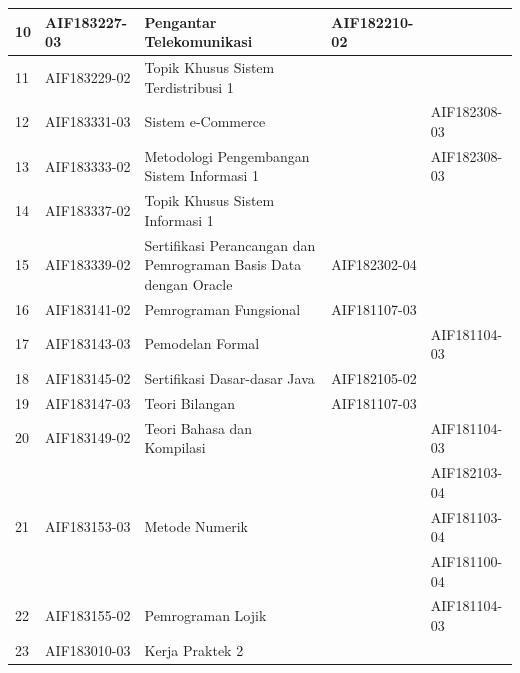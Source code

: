 \begin{table}[H]
\begin{tabular}{|p{0.5cm}|p{2.85cm}|p{4.95cm}|p{2.7cm}|p{2.7cm}|}
10 & AIF183227-03 & Pengantar Telekomunikasi                                         & AIF182210-02 &                    \\ \hline
11 & AIF183229-02 & Topik Khusus Sistem Terdistribusi 1                              &              &                    \\ \hline
12 & AIF183331-03 & Sistem e-Commerce                                                &              & AIF182308-03       \\ \hline
13 & AIF183333-02 & Metodologi Pengembangan Sistem Informasi 1                       &              & AIF182308-03       \\ \hline
14 & AIF183337-02 & Topik Khusus Sistem Informasi 1                                  &              &                    \\ \hline
15 & AIF183339-02 & Sertifikasi Perancangan dan Pemrograman Basis Data dengan Oracle & AIF182302-04 &                    \\ \hline
16 & AIF183141-02 & Pemrograman Fungsional                                           & AIF181107-03 &                    \\ \hline
17 & AIF183143-03 & Pemodelan Formal                                                 &              & AIF181104-03       \\ \hline
18 & AIF183145-02 & Sertifikasi Dasar-dasar Java                                     & AIF182105-02 &                    \\ \hline
19 & AIF183147-03 & Teori Bilangan                                                   & AIF181107-03 &                    \\ \hline
20 & AIF183149-02 & Teori Bahasa dan Kompilasi                                       &              & AIF181104-03       \\ 
   &              &                                                                  &              & AIF182103-04       \\ \hline
21 & AIF183153-03 & Metode Numerik                                                   &              & AIF181103-04       \\ 
   &              &                                                                  &              & AIF181100-04       \\ \hline
22 & AIF183155-02 & Pemrograman Lojik                                                &              & AIF181104-03       \\ \hline
23 & AIF183010-03 & Kerja Praktek 2                                                  &              &                    \\ \hline

\end{tabular}
\end{table}
